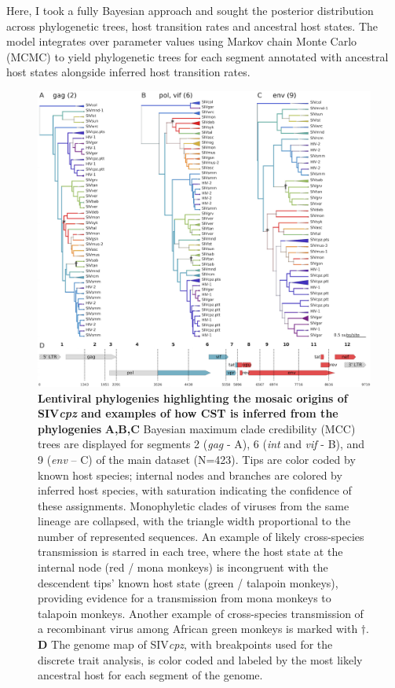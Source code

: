 Here, I took a fully Bayesian approach and sought the posterior distribution across phylogenetic trees, host transition rates and ancestral host states.
The model integrates over parameter values using Markov chain Monte Carlo (MCMC) to yield phylogenetic trees for each segment annotated with ancestral host states alongside inferred host transition rates.

\begin{figure}[ht!]
  \begin{centering}
    \includegraphics[width=.8\linewidth]{./png/siv_cpz.png}
  	\caption[Lentiviral phylogenies highlighting the mosaic origins of SIV\textit{cpz}]{\textbf{Lentiviral phylogenies highlighting the mosaic origins of SIV\textit{cpz} and examples of how CST is inferred from the phylogenies }
\textbf{A,B,C} Bayesian maximum clade credibility (MCC) trees are displayed for segments 2 (\textit{gag} - A), 6 (\textit{int} and \textit{vif} - B), and 9 (\textit{env} – C) of the main dataset (N=423).
Tips are color coded by known host species; internal nodes and branches are colored by inferred host species, with saturation indicating the confidence of these assignments.
Monophyletic clades of viruses from the same lineage are collapsed, with the triangle width proportional to the number of represented sequences.
An example of likely cross-species transmission is starred in each tree, where the host state at the internal node (red / mona monkeys) is incongruent with the descendent tips' known host state (green / talapoin monkeys), providing evidence for a transmission from mona monkeys to talapoin monkeys.
Another example of cross-species transmission of a recombinant virus among African green monkeys is marked with $\dagger$.
\textbf{D} The genome map of SIV\textit{cpz}, with breakpoints used for the discrete trait analysis, is color coded and labeled by the most likely ancestral host for each segment of the genome.
}
  	\label{siv_cpz}
  \end{centering}
\end{figure}

